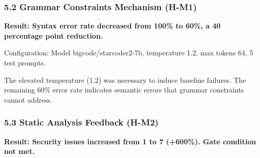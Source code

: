 \subsubsection{5.2 Grammar Constraints Mechanism (H-M1)}

\textbf{Result: Syntax error rate decreased from 100\% to 60\%, a 40 percentage point reduction.}

\begin{table}[htbp]
\centering
{}
\end{table}

Configuration: Model bigcode/starcoder2-7b, temperature 1.2, max tokens 64, 5 test prompts.

The elevated temperature (1.2) was necessary to induce baseline failures. The remaining 60\% error rate indicates semantic errors that grammar constraints cannot address.


\subsubsection{5.3 Static Analysis Feedback (H-M2)}

\textbf{Result: Security issues increased from 1 to 7 (+600\%). Gate condition not met.}

\begin{table}[htbp]
\centering
{}
\end{table}


